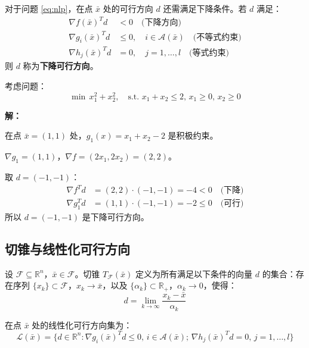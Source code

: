 \begin{conceptbox}[下降可行方向]
对于问题 \eqref{eq:nlp}，在点 $\bar{x}$ 处的可行方向 $d$ 还需满足下降条件。若 $d$ 满足：
\begin{align*}
\nabla f(\bar{x})^T d &< 0 \quad \text{(下降方向)} \\
\nabla g_i(\bar{x})^T d &\leq 0, \quad i \in \mathcal{A}(\bar{x}) \quad \text{(不等式约束)} \\
\nabla h_j(\bar{x})^T d &= 0, \quad j = 1, \ldots, l \quad \text{(等式约束)}
\end{align*}
则 $d$ 称为\textbf{下降可行方向}。
\end{conceptbox}

\begin{example}[可行方向验证]
考虑问题：
\[
\min \, x_1^2 + x_2^2, \quad \text{s.t. } x_1 + x_2 \leq 2, \, x_1 \geq 0, \, x_2 \geq 0
\]

\textbf{解：}

在点 $\bar{x} = (1, 1)$ 处，$g_1(x) = x_1 + x_2 - 2$ 是积极约束。

$\nabla g_1 = (1, 1)$，$\nabla f = (2x_1, 2x_2) = (2, 2)$。

取 $d = (-1, -1)$：
\begin{align*}
\nabla f^T d &= (2, 2) \cdot (-1, -1) = -4 < 0 \quad \text{(下降)} \\
\nabla g_1^T d &= (1, 1) \cdot (-1, -1) = -2 \leq 0 \quad \text{(可行)}
\end{align*}
所以 $d = (-1, -1)$ 是下降可行方向。
\end{example}

\subsection{切锥与线性化可行方向}\label{sec:tangent-cone}

\begin{definition}
设 $\mathcal{F} \subseteq \mathbb{R}^n$，$\bar{x} \in \mathcal{F}$。切锥 $T_{\mathcal{F}}(\bar{x})$ 定义为所有满足以下条件的向量 $d$ 的集合：存在序列 $\{x_k\} \subset \mathcal{F}$，$x_k \to \bar{x}$，以及 $\{\alpha_k\} \subset \mathbb{R}_+$，$\alpha_k \to 0$，使得：
\[
d = \lim_{k \to \infty} \frac{x_k - \bar{x}}{\alpha_k}
\]
\end{definition}

\begin{definition}
在点 $\bar{x}$ 处的线性化可行方向集为：
\[
\mathcal{L}(\bar{x}) = \{d \in \mathbb{R}^n : \nabla g_i(\bar{x})^T d \leq 0, \, i \in \mathcal{A}(\bar{x}); \, \nabla h_j(\bar{x})^T d = 0, \, j = 1,\ldots,l\}
\]
\end{definition}

